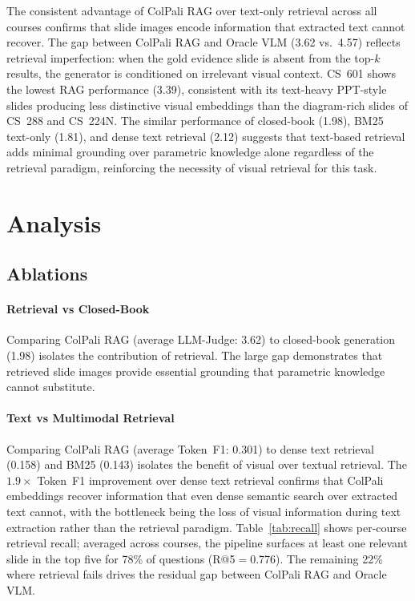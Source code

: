 \documentclass{article} %
\begin{document}
The consistent advantage of ColPali RAG over text-only retrieval across all courses confirms that slide images encode information that extracted text cannot recover. The gap between ColPali RAG and Oracle VLM (3.62 vs.\ 4.57) reflects retrieval imperfection: when the gold evidence slide is absent from the top-$k$ results, the generator is conditioned on irrelevant visual context. CS~601 shows the lowest RAG performance (3.39), consistent with its text-heavy PPT-style slides producing less distinctive visual embeddings than the diagram-rich slides of CS~288 and CS~224N. The similar performance of closed-book (1.98), BM25 text-only (1.81), and dense text retrieval (2.12) suggests that text-based retrieval adds minimal grounding over parametric knowledge alone regardless of the retrieval paradigm, reinforcing the necessity of visual retrieval for this task.

\section{Analysis}

\subsection{Ablations}

\paragraph{Retrieval vs Closed-Book}
Comparing ColPali RAG (average LLM-Judge: 3.62) to closed-book generation (1.98) isolates the contribution of retrieval. The large gap demonstrates that retrieved slide images provide essential grounding that parametric knowledge cannot substitute.

\paragraph{Text vs Multimodal Retrieval}
Comparing ColPali RAG (average Token~F1: 0.301) to dense text retrieval (0.158) and BM25 (0.143) isolates the benefit of visual over textual retrieval. The $1.9\times$ Token~F1 improvement over dense text retrieval confirms that ColPali embeddings recover information that even dense semantic search over extracted text cannot, with the bottleneck being the loss of visual information during text extraction rather than the retrieval paradigm. Table~\ref{tab:recall} shows per-course retrieval recall; averaged across courses, the pipeline surfaces at least one relevant slide in the top five for 78\% of questions (R@5$=$0.776). The remaining 22\% where retrieval fails drives the residual gap between ColPali RAG and Oracle VLM.
\end{document}
